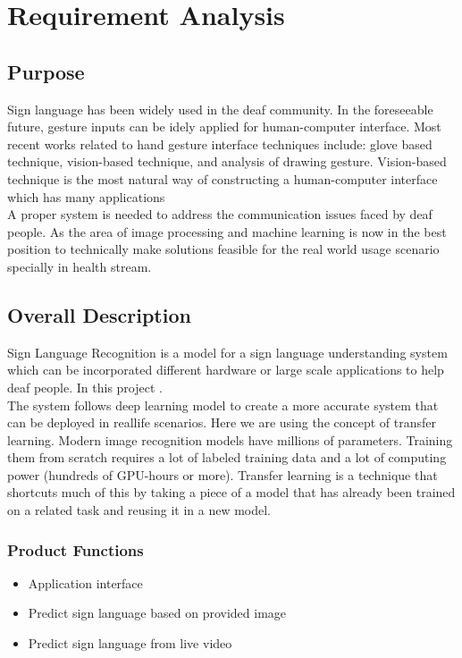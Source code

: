 \chapter{Requirement Analysis}

\section{Purpose}
\par
Sign language has been widely used in the deaf community. In the foreseeable future, gesture inputs can be idely applied for human-computer interface. Most recent works related to hand gesture interface techniques include: glove based technique, vision-based technique, and analysis of drawing gesture. Vision-based technique is the
most natural way of constructing a human-computer interface which has many applications  \\

A proper system is needed to address the communication issues faced by deaf people. As the area of image processing and machine learning is now in the best position to technically make solutions feasible for the real world usage scenario specially in health stream. \\

\section{Overall Description}
\par
Sign Language Recognition is a model for a sign language understanding system which can be incorporated different hardware or large scale applications to help deaf people. In this project .\\

The system follows deep learning model to create a more accurate system that can be deployed in reallife scenarios. Here we are using the concept of transfer learning. Modern image recognition models have millions of parameters. Training
them from scratch requires a lot of labeled training data and a lot of
computing power (hundreds of GPU-hours or more). Transfer learning is
a technique that shortcuts much of this by taking a piece of a model that
has already been trained on a related task and reusing it in a new model. \\


\subsection{Product Functions}
\begin{itemize}
    \item Application interface
    \item Predict sign language based on provided image 
    \item Predict sign language from live video 

\end{itemize}

